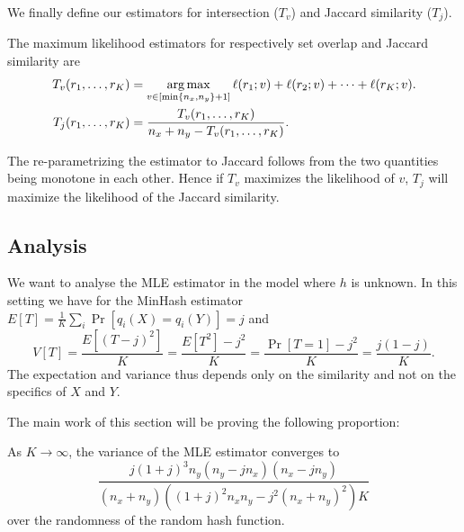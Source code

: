 We finally define our estimators for intersection ($T_v$) and Jaccard similarity ($T_j$).
\begin{definition}
   The maximum likelihood estimators for respectively set overlap and Jaccard similarity are
   \begin{align}
      T_v(r_1,\dots,r_K) &= \operatorname*{arg\,max}_{v\in[\min\{n_x,n_y\}+1]} \ell(r_1; v) + \ell(r_2; v) + \dots + \ell(r_K; v).
      \\T_j(r_1,\dots,r_K) &= \frac{T_v(r_1,\dots,r_K)}{n_x+n_y - T_v(r_1,\dots,r_K)}.
   \end{align}
\end{definition}
%
The re-parametrizing the estimator to Jaccard follows from the two quantities being monotone in each other.
Hence if $T_v$ maximizes the likelihood of $v$, $T_j$ will maximize the likelihood of the Jaccard similarity.

\subsection{Analysis}\label{sec:analysis}

We want to analyse the MLE estimator in the model where $h$ is unknown.
   In this setting we have for the MinHash estimator $E[T]=\frac1K\sum_i\Pr[q_i(X)=q_i(Y)] = j$ and
\[
   V[T] =
   \frac{E[(T-j)^2]}{K}
      = \frac{E[T^2] - j^2}{K}
      = \frac{\Pr[T=1] - j^2}{K}
      = \frac{j(1-j)}{K}.
      \label{eq:minvar}
\]
The expectation and variance thus depends only on the similarity and not on the specifics of $X$ and $Y$.

The main work of this section will be proving the following proportion:
\begin{proposition}\label{prop:mle_var}
   As $K\to\infty$, the variance of the MLE estimator converges to
   \[
      \frac{j (1+j)^3 n_y (n_y-j n_x) (n_x-j n_y)}{(n_x+n_y) \left((1+j)^2 n_xn_y - j^2 (n_x+n_y)^2\right)K}
   \label{eq:mle_var}
   \]
   over the randomness of the random hash function.
\end{proposition}

